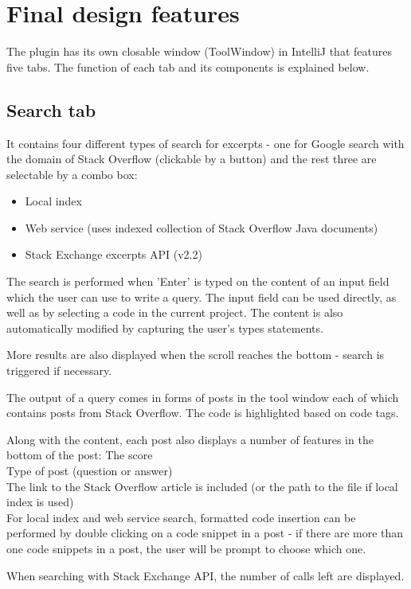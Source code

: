 \documentclass{l4proj}
\begin{document}
\section{Final design features}
The plugin has its own closable window (ToolWindow) in IntelliJ that features five tabs. The function of each tab and its components is explained below.

\subsection{Search tab}
It contains four different types of search for excerpts - one for Google search with the domain of Stack Overflow (clickable by a button) and the rest three are selectable by a combo box:

\begin{itemize}
\item Local index
\item Web service (uses indexed collection of Stack Overflow Java documents)
\item Stack Exchange excerpts API (v2.2)
\end{itemize}

The search is performed when 'Enter' is typed on the content of an input field which the user can use to write a query. The input field can be used directly, as well as by selecting a code in the current project. The content is also automatically modified by capturing the user's types statements.

More results are also displayed when the scroll reaches the bottom - search is triggered if necessary.

The output of a query comes in forms of posts in the tool window each of
which contains posts from Stack Overflow. The code is highlighted based on code tags.

Along with the content, each post also displays a number of features in the bottom of the post:
The score\\
Type of post (question or answer)\\
The link to the Stack Overflow article is included (or the path to the file if local index is used)\\

For local index and web service search, formatted code insertion can be performed by double clicking on a code snippet in a post - if there are more than one code snippets in a post, the user will be prompt to choose which one.

When searching with Stack Exchange API, the number of calls left are displayed.
\end{document}
